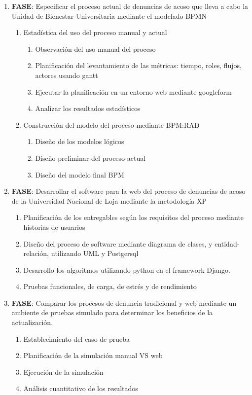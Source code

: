 \begin{enumerate}
    \item \textbf{FASE}: Especificar el proceso actual de denuncias de acoso que lleva a cabo la Unidad de Bienestar Universitaria mediante el modelado BPMN
    \begin{enumerate}
        \item Estadística del uso del proceso manual y actual
        \begin{enumerate}
            \item Observación del uso manual del proceso
            \item Planificación del levantamiento de las métricas: tiempo, roles, flujos, actores usando gantt
            \item Ejecutar la planificación en un entorno web mediante googleform
            \item Analizar los resultados estadísticos 
        \end{enumerate}
        \item Construcción del modelo del proceso mediante BPM:RAD
        \begin{enumerate}
            \item Diseño de los modelos lógicos 
            \item Diseño preliminar del proceso actual 
            \item Diseño del modelo final BPM 
        \end{enumerate}
        
        
    \end{enumerate}
    
    \item \textbf{FASE}: Desarrollar el software para la web del proceso de denuncias de acoso de la Universidad Nacional de Loja mediante la metodología XP
    \begin{enumerate}
        \item Planificación de los entregables según los requisitos del proceso mediante historias de usuarios
        \item Diseño del proceso de software mediante diagrama de clases, y entidad-relación, utilizando UML y Postgersql
        \item Desarrollo los algoritmos utilizando python en el framework Django.
        \item Pruebas funcionales, de carga, de estrés y de rendimiento
    \end{enumerate}
    
    \item \textbf{FASE}: Comparar los procesos de denuncia tradicional y web mediante un ambiente de pruebas simulado para determinar los beneficios de la actualización.
     \begin{enumerate}
        \item Establecimiento del caso de prueba
        \item Planificación de la simulación manual VS web
        \item Ejecución de la simulación
        \item Análisis cuantitativo de los resultados
    \end{enumerate}
    
\end{enumerate}

